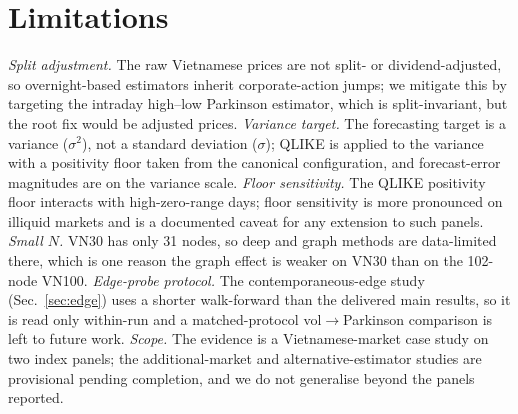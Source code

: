 \documentclass[runningheads]{llncs}
\begin{document}
\section{Limitations}
\emph{Split adjustment.} The raw Vietnamese prices are not split- or dividend-adjusted, so
overnight-based estimators inherit corporate-action jumps; we mitigate this by targeting the intraday
high--low Parkinson estimator, which is split-invariant, but the root fix would be adjusted prices.
\emph{Variance target.} The forecasting target is a variance ($\sigma^2$), not a standard deviation
($\sigma$); QLIKE is applied to the variance with a positivity floor taken from the canonical
configuration, and forecast-error magnitudes are on the variance scale. \emph{Floor sensitivity.} The
QLIKE positivity floor interacts with high-zero-range days; floor sensitivity is more pronounced on
illiquid markets and is a documented caveat for any extension to such panels. \emph{Small $N$.} VN30
has only 31 nodes, so deep and graph methods are data-limited there, which is one reason the graph
effect is weaker on VN30 than on the 102-node VN100. \emph{Edge-probe protocol.} The
contemporaneous-edge study (Sec.~\ref{sec:edge}) uses a shorter walk-forward than the delivered main
results, so it is read only within-run and a matched-protocol vol$\to$Parkinson comparison is left to
future work. \emph{Scope.} The evidence is a Vietnamese-market case study on two index panels; the
additional-market and alternative-estimator studies are provisional pending completion, and we do not
generalise beyond the panels reported.
\end{document}
